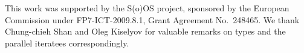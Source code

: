 %

\acks

This work was supported by the S(o)OS project, sponsored by the European Commission under FP7-ICT-2009.8.1, Grant Agreement No.~248465.
We thank Chung-chieh Shan and Oleg Kiselyov for valuable remarks on
 types and the parallel iteratees correspondingly.

